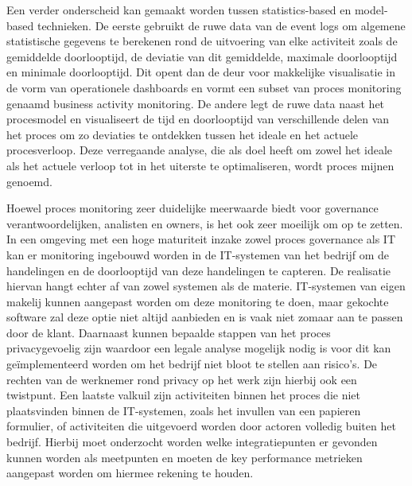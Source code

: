 Een verder onderscheid kan gemaakt worden tussen statistics-based en model-based technieken. De eerste gebruikt de ruwe data van de event logs om algemene statistische gegevens te berekenen rond de uitvoering van elke activiteit zoals de gemiddelde doorlooptijd, de deviatie van dit gemiddelde, maximale doorlooptijd en minimale doorlooptijd. Dit opent dan de deur voor makkelijke visualisatie in de vorm van operationele dashboards en vormt een subset van proces monitoring genaamd business activity monitoring. De andere legt de ruwe data naast het procesmodel en visualiseert de tijd en doorlooptijd van verschillende delen van het proces om zo deviaties te ontdekken tussen het ideale en het actuele procesverloop. Deze verregaande analyse, die als doel heeft om zowel het ideale als het actuele verloop tot in het uiterste te optimaliseren, wordt proces mijnen genoemd. \autocite[pp. 414-415]{Dumas2018}\newline

Hoewel proces monitoring zeer duidelijke meerwaarde biedt voor governance verantwoordelijken, analisten en owners, is het ook zeer moeilijk om op te zetten. In een omgeving met een hoge maturiteit inzake zowel proces governance als IT kan er monitoring ingebouwd worden in de IT-systemen van het bedrijf om de handelingen en de doorlooptijd van deze handelingen te capteren. De realisatie hiervan hangt echter af van zowel systemen als de materie. IT-systemen van eigen makelij kunnen aangepast worden om deze monitoring te doen, maar gekochte software zal deze optie niet altijd aanbieden en is vaak niet zomaar aan te passen door de klant. Daarnaast kunnen bepaalde stappen van het proces privacygevoelig zijn waardoor een legale analyse mogelijk nodig is voor dit kan geïmplementeerd worden om het bedrijf niet bloot te stellen aan risico’s. De rechten van de werknemer rond privacy op het werk zijn hierbij ook een twistpunt. Een laatste valkuil zijn activiteiten binnen het proces die niet plaatsvinden binnen de IT-systemen, zoals het invullen van een papieren formulier, of activiteiten die uitgevoerd worden door actoren volledig buiten het bedrijf. Hierbij moet onderzocht worden welke integratiepunten er gevonden kunnen worden als meetpunten en moeten de key performance metrieken aangepast worden om hiermee rekening te houden.\newline

